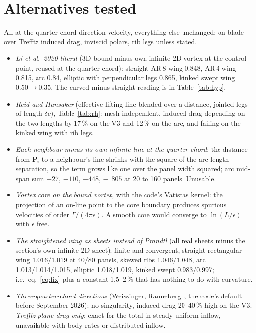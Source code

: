 \documentclass[11pt,a4paper]{article}
\begin{document}
\appendix
\section{Alternatives tested}
\label{app:alt}
All at the quarter-chord direction velocity, everything else unchanged; on-blade over Trefftz induced drag, inviscid polars, rib legs unless stated.
\begin{itemize}[nosep]
  \item \emph{Li et al.\ 2020 literal} (3D bound minus own infinite 2D vortex at the control point, reused at the quarter chord): straight AR\,8 wing 0.848, AR\,4 wing 0.815, arc 0.84, elliptic with perpendicular legs 0.865, kinked swept wing $0.50\to0.35$. The curved-minus-straight reading is in Table~\ref{tab:hyp}.
  \item \emph{Reid and Hunsaker} (effective lifting line blended over a distance, jointed legs of length $\delta c$), Table~\ref{tab:rh}: mesh-independent, induced drag depending on the two lengths by 17\,\% on the V3 and 12\,\% on the arc, and failing on the kinked wing with rib legs.
  \item \emph{Each neighbour minus its own infinite line at the quarter chord}: the distance from $\mathbf P_i$ to a neighbour's line shrinks with the square of the arc-length separation, so the term grows like one over the panel width squared; arc mid-span sum $-27$, $-110$, $-448$, $-1805$ at 20 to 160 panels. Unusable.
  \item \emph{Vortex core on the bound vortex}, with the code's Vatistas kernel: the projection of an on-line point to the core boundary produces spurious velocities of order $\Gamma/(4\pi\epsilon)$. A smooth core would converge to $\ln(L/\epsilon)$ with $\epsilon$ free.
  \item \emph{The straightened wing as sheets instead of Prandtl} (all real sheets minus the section's own infinite 2D sheet): finite and convergent, straight rectangular wing 1.016/1.019 at 40/80 panels, skewed ribs 1.046/1.048, arc 1.013/1.014/1.015, elliptic 1.018/1.019, kinked swept 0.983/0.997; i.e.\ eq.~\eqref{eq:fix} plus a constant 1.5--2\,\% that has nothing to do with curvature.
  \item \emph{Three-quarter-chord directions} (Weissinger, Ranneberg~\cite{ranneberg2015}, the code's default before September 2026): no singularity, induced drag 20--40\,\% high on the V3. \emph{Trefftz-plane drag only}: exact for the total in steady uniform inflow, unavailable with body rates or distributed inflow.
\end{itemize}
\end{document}
